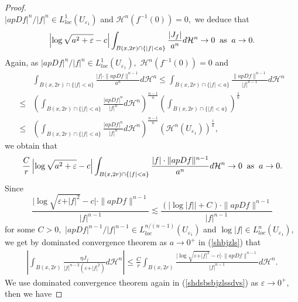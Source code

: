 \documentclass[11pt,twoside]{article}
\theoremstyle{definition}
\theoremstyle{remark}
\newcommand{\abs}[1]{\left|#1\right|}
\newcommand{\aleq}{\lesssim}
\begin{document}
\begin{proof}
\begin{equation}
\end{equation}
 $\vert apDf\vert^{n}/\vert f\vert^{n}\in L_{loc}^{1}(U_{\varepsilon_{1}})$ and $\mathcal{H}^{n}(f^{-1}(0))=0,$ we deduce that 
 $$\left\vert\log\sqrt{a^{2}+\varepsilon}-c\right\vert\int_{B(x,2r)\cap\{\vert f\vert<a\}}\frac{\vert J_{f}\vert}{a^{n}}d\mathcal{H}^{n}\rightarrow0\;\;{\rm as}\;\;a\rightarrow0.$$
Again, as $\vert apDf\vert^{n}/\vert f\vert^{n}\in L_{loc}^{1}(U_{\varepsilon_{1}}),$  $\mathcal{H}^{n}(f^{-1}(0))=0$ and 
\begin{equation}
\begin{aligned}
&\int_{B(x,2r)\cap\{\vert f\vert<a\}}\frac{\vert f\vert\cdot\|apDf\|^{n-1}}{a^{n}}d\mathcal{H}^{n}\leq\int_{B(x,2r)\cap\{\vert f\vert<a\}}\frac{\|apDf\|^{n-1}}{\vert f\vert^{n-1}}d\mathcal{H}^{n}\\
\leq&\left(\int_{B(x,2r)\cap\{\vert f\vert<a\}}\frac{\vert apDf\vert^{n}}{\vert f\vert^{n}}d\mathcal{H}^{n}\right)^{\frac{n-1}{n}}\left(\int_{B(x,2r)\cap\{\vert f\vert<a\}}\right)^{\frac{1}{n}}\\
\leq&\left(\int_{B(x,2r)\cap\{\vert f\vert<a\}}\frac{\vert apDf\vert^{n}}{\vert f\vert^{n}}d\mathcal{H}^{n}\right)^{\frac{n-1}{n}}\left(\mathcal{H}^{n}(U_{\varepsilon_{1}})\right)^{\frac{1}{n}},
\end{aligned}
\end{equation}
we obtain that 
 $$\frac{C}{r}\left\vert\log\sqrt{a^{2}+\varepsilon}-c\right\vert\int_{B(x,2r)\cap\{\vert f\vert<a\}}\frac{\vert f\vert\cdot\|apDf\|^{n-1}}{a^{n}}d\mathcal{H}^{n}\rightarrow0\;\;{\rm as}\;\;a\rightarrow0.$$
Since 
$$\frac{\vert\log\sqrt{\varepsilon+\vert f\vert^{2}}-c\vert\cdot\|apDf\|^{n-1}}{\vert f\vert^{n-1}}\aleq\frac{(\vert\log\vert f\vert\vert+C)\cdot\|apDf\|^{n-1}}{\vert f\vert^{n-1}}$$
for some $C>0,$  $\vert apDf\vert^{n-1}/\vert f\vert^{n-1}\in L_{loc}^{n/(n-1)}(U_{\varepsilon_{1}})$ and $\log\vert f\vert\in L_{loc}^{n}(U_{\varepsilon_{1}}),$ we get by dominated convergence theorem as $a\rightarrow0^{+}$ in
(\ref{shbjzls}) that 
\begin{equation}\label{shdsbsbjzlssdvs}
\begin{aligned}
\abs{\int_{B(x,2r)}\frac{\eta J_{f}}{\vert f\vert^{n-2}(\varepsilon+\vert f\vert^{2})}d\mathcal{H}^{n}}
\leq\frac{C}{r}\int_{B(x,2r)}\frac{\vert\log\sqrt{\varepsilon+\vert f\vert^{2}}-c\vert\cdot\|apDf\|^{n-1}}{\vert f\vert^{n-1}}d\mathcal{H}^{n}.
\end{aligned}
\end{equation}
 We use dominated convergence theorem again in (\ref{shdsbsbjzlssdvs}) as $\varepsilon\rightarrow0^{+},$ then we have  

\end{proof}
\end{document}
